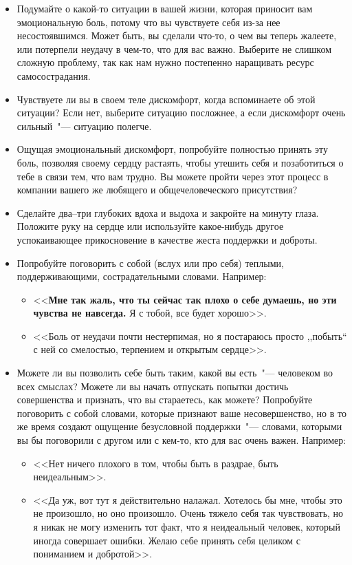 \begin{itemize}
	\item Подумайте о какой-то ситуации в вашей жизни, которая приносит вам эмоциональную боль, потому что вы чувствуете себя из-за нее несостоявшимся. Может быть, вы сделали что-то, о чем вы теперь жалеете, или потерпели неудачу в чем-то, что для вас важно. Выберите не слишком сложную проблему, так как нам нужно постепенно наращивать ресурс самосострадания.
	
	\item Чувствуете ли вы в своем теле дискомфорт, когда вспоминаете об этой ситуации? Если нет, выберите ситуацию посложнее, а если дискомфорт очень сильный~"--- ситуацию полегче.
	
	\item Ощущая эмоциональный дискомфорт, попробуйте полностью принять эту боль, позволяя своему сердцу растаять, чтобы утешить себя и позаботиться о тебе в связи тем, что вам трудно. Вы можете пройти через этот процесс в компании вашего же любящего и общечеловеческого присутствия?
	
	\item Сделайте два--три глубоких вдоха и выдоха и закройте на минуту глаза. Положите руку на сердце или используйте какое-нибудь другое успокаивающее прикосновение в качестве жеста поддержки и доброты.
	
	\item Попробуйте поговорить с собой (вслух или про себя) теплыми, поддерживающими, сострадательными словами. Например:
	
	\begin{itemize}
		\item <<\textbf{Мне так жаль, что ты сейчас так плохо о себе думаешь, но эти чувства не навсегда.} Я с тобой, все будет хорошо>>.
		
		\item <<Боль от неудачи почти нестерпимая, но я постараюсь просто ,,побыть`` с ней со смелостью, терпением и открытым сердце>>.
	\end{itemize}

	\item Можете ли вы позволить себе быть таким, какой вы есть~"--- человеком во всех смыслах? Можете ли вы начать отпускать попытки достичь совершенства и признать, что вы стараетесь, как можете? Попробуйте поговорить с собой словами, которые признают ваше несовершенство, но в то же время создают ощущение безусловной поддержки~"--- словами, которыми вы бы поговорили с другом или с кем-то, кто для вас очень важен. Например:
	
	\begin{itemize}
		\item <<Нет ничего плохого в том, чтобы быть в раздрае, быть неидеальным>>.
		
		\item <<Да уж, вот тут я действительно налажал. Хотелось бы мне, чтобы это не произошло, но оно произошло. Очень тяжело себя так чувствовать, но я никак не могу изменить тот факт, что я неидеальный человек, который иногда совершает ошибки. Желаю себе принять себя целиком с пониманием и добротой>>.   
	\end{itemize}
\end{itemize}

